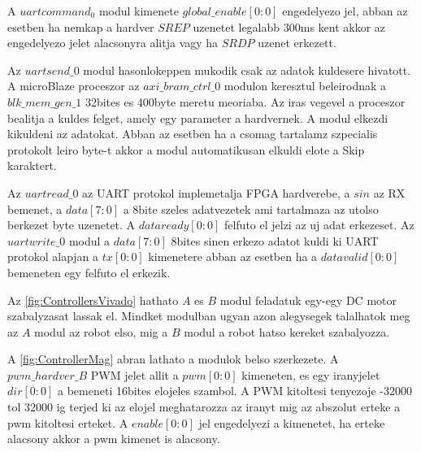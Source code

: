 A $uartcommand_0$ modul kimenete $global\_enable[0:0]$ engedelyezo jel, abban az esetben ha nemkap a hardver $SREP$ uzenetet legalabb 300ms kent akkor az engedelyezo jelet alacsonyra alitja vagy ha $SRDP$ uzenet erkezett.

Az $uartsend\_0$ modul hasonlokeppen mukodik csak az adatok kuldesere hivatott. A microBlaze proceszor az $axi\_bram\_ctrl\_0$ modulon keresztul beleirodnak a $blk\_mem\_gen\_1$ \cite{DualPortRam} 32bites es 400byte meretu meoriaba.
Az iras vegevel a proceszor bealitja a kuldes felget, amely egy parameter a hardvernek. A modul elkezdi kikuldeni az adatokat. Abban az esetben ha a csomag tartalamz szpecialis protokolt leiro byte-t akkor a modul automatikusan elkuldi elote a Skip karaktert.

Az $uartread\_0$ az UART protokol implemetalja FPGA hardverebe, a $sin$ az RX bemenet, a $data[7:0]$ a 8bite szeles adatvezetek ami tartalmaza az utolso berkezet byte uzenetet. A $dataready[0:0]$ felfuto el jelzi az uj adat erkezeset. Az $uartwrite\_0$ modul a $data[7:0]$ 8bites sinen erkezo adatot kuldi ki UART protokol alapjan a $tx[0:0]$ kimenetere abban az esetben ha a $datavalid[0:0]$ bemeneten egy felfuto el erkezik.

Az \ref{fig:ControllersVivado} hathato $A$ es $B$ modul feladatuk egy-egy DC motor szabalyzasat lassak el. Mindket modulban ugyan azon alegysegek talalhatok meg az $A$ modul az robot elso, mig a $B$ modul a robot hatso kereket szabalyozza.

A \ref{fig:ControllerMag} abran lathato a modulok belso szerkezete. A $pwm\_hardver\_B$ PWM jelet allit a $pwm[0:0]$ kimeneten, es egy iranyjelet $dir[0:0]$ a bemeneti 16bites elojeles szambol. A PWM kitoltesi tenyezoje -32000 tol 32000 ig terjed ki az elojel meghatarozza az iranyt mig az abszolut erteke a pwm kitoltesi erteket. A $enable[0:0]$ jel engedelyezi a kimenetet, ha erteke alacsony akkor a pwm kimenet is alacsony.


